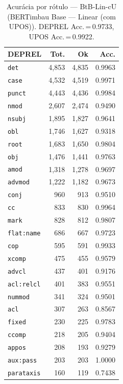 \begin{table}[ht]
\centering
\caption{Acurácia por rótulo --- BtB-Lin-cU (BERTimbau Base — Linear (com UPOS)). DEPREL Acc.\,=\,0.9733, UPOS Acc.\,=\,0.9922.}
\label{tab:acc-predict-test-df-bertimbau-base-linear}
\begin{minipage}[t]{0.55\linewidth}
\centering\scriptsize
\begin{tabular}{lrrr}
\toprule
\textbf{DEPREL} & \textbf{Tot.} & \textbf{Ok} & \textbf{Acc.} \\
\midrule
\texttt{det} & 4,853 & 4,835 & 0.9963 \\
\texttt{case} & 4,532 & 4,519 & 0.9971 \\
\texttt{punct} & 4,443 & 4,436 & 0.9984 \\
\texttt{nmod} & 2,607 & 2,474 & 0.9490 \\
\texttt{nsubj} & 1,895 & 1,827 & 0.9641 \\
\texttt{obl} & 1,746 & 1,627 & 0.9318 \\
\texttt{root} & 1,683 & 1,650 & 0.9804 \\
\texttt{obj} & 1,476 & 1,441 & 0.9763 \\
\texttt{amod} & 1,318 & 1,278 & 0.9697 \\
\texttt{advmod} & 1,222 & 1,182 & 0.9673 \\
\texttt{conj} & 960 & 913 & 0.9510 \\
\texttt{cc} & 833 & 830 & 0.9964 \\
\texttt{mark} & 828 & 812 & 0.9807 \\
\texttt{flat\!:\!name} & 686 & 667 & 0.9723 \\
\texttt{cop} & 595 & 591 & 0.9933 \\
\texttt{xcomp} & 475 & 455 & 0.9579 \\
\texttt{advcl} & 437 & 401 & 0.9176 \\
\texttt{acl\!:\!relcl} & 401 & 383 & 0.9551 \\
\texttt{nummod} & 341 & 324 & 0.9501 \\
\texttt{acl} & 307 & 263 & 0.8567 \\
\texttt{fixed} & 230 & 225 & 0.9783 \\
\texttt{ccomp} & 218 & 205 & 0.9404 \\
\texttt{appos} & 208 & 193 & 0.9279 \\
\texttt{aux\!:\!pass} & 203 & 203 & 1.0000 \\
\texttt{parataxis} & 160 & 119 & 0.7438 \\

\end{tabular}
\end{minipage}
\end{table}
